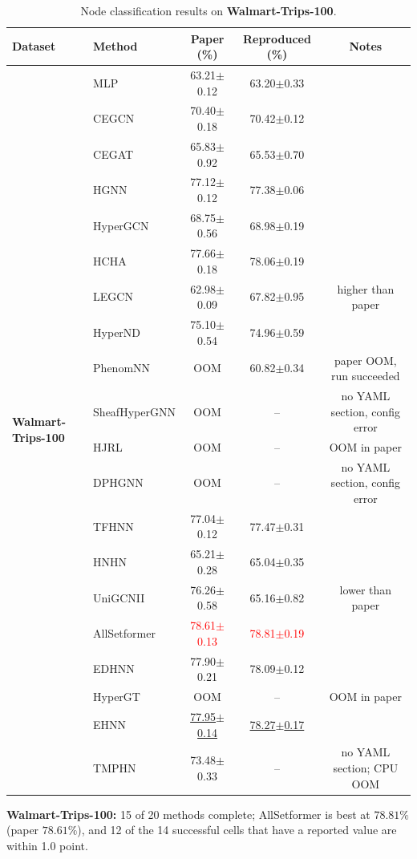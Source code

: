\documentclass[11pt,a4paper]{article}
\begin{document}
\begin{table}[H]
	\centering\small
	\begin{tabular}{llccc}
		\toprule
		Dataset & Method & Paper (\%) & Reproduced (\%) & Notes \\
		\midrule
		\multirow{20}{*}{\textbf{Walmart-Trips-100}} & MLP               & 63.21$\pm$0.12   & 63.20$\pm$0.33   &  \\
		 & CEGCN             & 70.40$\pm$0.18   & 70.42$\pm$0.12   &  \\
		 & CEGAT             & 65.83$\pm$0.92   & 65.53$\pm$0.70   &  \\
		 & HGNN              & 77.12$\pm$0.12   & 77.38$\pm$0.06   &  \\
		 & HyperGCN          & 68.75$\pm$0.56   & 68.98$\pm$0.19   &  \\
		 & HCHA              & 77.66$\pm$0.18   & 78.06$\pm$0.19   &  \\
		 & LEGCN             & 62.98$\pm$0.09   & 67.82$\pm$0.95   & higher than paper \\
		 & HyperND           & 75.10$\pm$0.54   & 74.96$\pm$0.59   &  \\
		 & PhenomNN          & OOM              & 60.82$\pm$0.34   & paper OOM, run succeeded \\
		 & SheafHyperGNN     & OOM              & --               & no YAML section, config error \\
		 & HJRL              & OOM              & --               & OOM in paper \\
		 & DPHGNN            & OOM              & --               & no YAML section, config error \\
		 & TFHNN             & 77.04$\pm$0.12   & 77.47$\pm$0.31   &  \\
		 & HNHN              & 65.21$\pm$0.28   & 65.04$\pm$0.35   &  \\
		 & UniGCNII          & 76.26$\pm$0.58   & 65.16$\pm$0.82   & lower than paper \\
		 & AllSetformer      & \textcolor{red}{78.61$\pm$0.13}   & \textcolor{red}{78.81$\pm$0.19}   &  \\
		 & EDHNN             & 77.90$\pm$0.21   & 78.09$\pm$0.12   &  \\
		 & HyperGT           & OOM              & --               & OOM in paper \\
		 & EHNN              & \underline{77.95$\pm$0.14}   & \underline{78.27$\pm$0.17}   &  \\
		 & TMPHN             & 73.48$\pm$0.33   & --               & no YAML section; CPU OOM \\
		\bottomrule
	\end{tabular}
	\caption{Node classification results on \textbf{Walmart-Trips-100}.}
\end{table}
\par\smallskip
\noindent\textbf{Walmart-Trips-100:} 15 of 20 methods complete; AllSetformer is best at $78.81\%$ (paper $78.61\%$), and 12 of the 14 successful cells that have a reported value are within 1.0 point.
\end{document}
